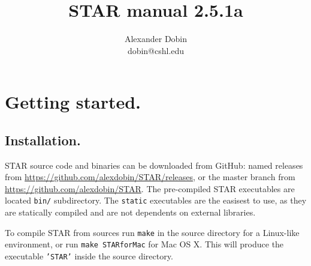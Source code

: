\documentclass[12pt]{article}
\begin{document}
\hypersetup{
	linkcolor=MidnightBlue
	}


\newcommand{\optn}[1]{\sloppy\textcolor{violet}{\texttt{--#1}}}
\newcommand{\opt}[1]{\sloppy\hyperlink{#1}{\optn{#1}}}
\newcommand{\optv}[1]{\sloppy\texttt{#1}}
\newcommand{\optvr}[1]{\sloppy\textit{\texttt{#1}}}

\newcommand{\code}[1]{\sloppy\texttt{#1}}
	
\newcommand{\codelines}[1]{\begin{adjustwidth}{0.5in}{0in}
	\raggedright\texttt{#1}
	\end{adjustwidth}}

\newcommand{\ofilen}[1]{\sloppy\texttt{#1}}

\newcommand{\sechyperref}[1]{\hyperref[#1]{Section \ref{#1}. \nameref{#1}}}

\title{STAR manual 2.5.1a}
\author{Alexander Dobin\\
dobin@cshl.edu}
\maketitle
\tableofcontents

\newpage

\section{Getting started.}
\subsection{Installation.}

STAR source code and binaries can be downloaded from GitHub: named releases from \url{https://github.com/alexdobin/STAR/releases}, or the master branch from \url{https://github.com/alexdobin/STAR}. The pre-compiled STAR executables are  located \code{bin/} subdirectory. The \code{static} executables are the easisest to use, as they are statically compiled and are not dependents on external libraries. 

To compile STAR from sources run \code{make} in the source directory for a Linux-like environment, or run \code{make STARforMac} for Mac OS X. This will produce the executable \code{'STAR'} inside the source directory.
\end{document}
